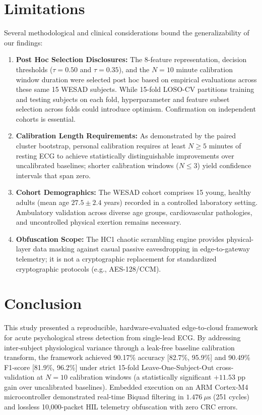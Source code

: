 \documentclass[conference]{IEEEtran}
\begin{document}
\section{Limitations}
\label{sec:limitations}
Several methodological and clinical considerations bound the generalizability of our findings:
\begin{enumerate}
    \item \textbf{Post Hoc Selection Disclosures:} The 8-feature representation, decision thresholds ($\tau=0.50$ and $\tau=0.35$), and the $N=10$ minute calibration window duration were selected post hoc based on empirical evaluations across these same 15 WESAD subjects. While 15-fold LOSO-CV partitions training and testing subjects on each fold, hyperparameter and feature subset selection across folds could introduce optimism. Confirmation on independent cohorts is essential.
    \item \textbf{Calibration Length Requirements:} As demonstrated by the paired cluster bootstrap, personal calibration requires at least $N \ge 5$ minutes of resting ECG to achieve statistically distinguishable improvements over uncalibrated baselines; shorter calibration windows ($N \le 3$) yield confidence intervals that span zero.
    \item \textbf{Cohort Demographics:} The WESAD cohort comprises 15 young, healthy adults (mean age $27.5 \pm 2.4$ years) recorded in a controlled laboratory setting. Ambulatory validation across diverse age groups, cardiovascular pathologies, and uncontrolled physical exertion remains necessary.
    \item \textbf{Obfuscation Scope:} The HC1 chaotic scrambling engine provides physical-layer data masking against casual passive eavesdropping in edge-to-gateway telemetry; it is not a cryptographic replacement for standardized cryptographic protocols (e.g., AES-128/CCM).
\end{enumerate}

\section{Conclusion}
This study presented a reproducible, hardware-evaluated edge-to-cloud framework for acute psychological stress detection from single-lead ECG. By addressing inter-subject physiological variance through a leak-free baseline calibration transform, the framework achieved 90.17\% accuracy [82.7\%, 95.9\%] and 90.49\% F1-score [81.9\%, 96.2\%] under strict 15-fold Leave-One-Subject-Out cross-validation at $N=10$ calibration windows (a statistically significant $+11.53\text{ pp}$ gain over uncalibrated baselines). Embedded execution on an ARM Cortex-M4 microcontroller demonstrated real-time Biquad filtering in $1.476~\mu\text{s}$ (251 cycles) and lossless 10,000-packet HIL telemetry obfuscation with zero CRC errors.



\end{document}
